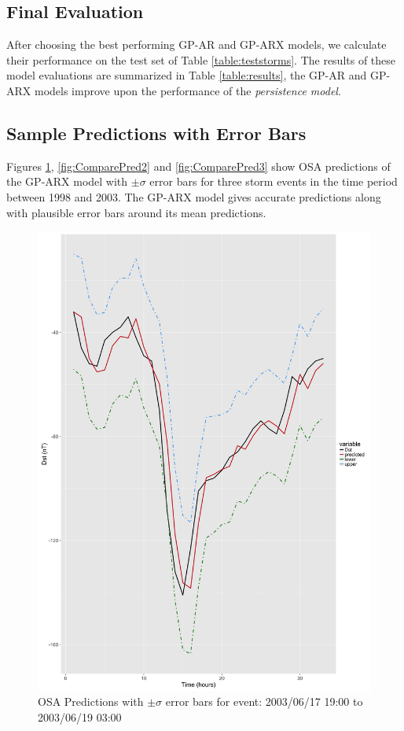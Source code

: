 \documentclass{article}
\begin{document}
\subsection*{Final Evaluation}

After choosing the best performing GP-AR and GP-ARX models, we calculate their performance on the test set of Table \ref{table:teststorms}. The results of these model evaluations are summarized in Table \ref{table:results}, the GP-AR and GP-ARX models improve upon the performance of the \emph{persistence model}.

\subsection*{Sample Predictions with Error Bars}

Figures \ref{fig:ComparePred1}, \ref{fig:ComparePred2} and \ref{fig:ComparePred3} show OSA predictions of the GP-ARX model with $\pm \sigma$ error bars for three storm events in the time period between 1998 and 2003. The GP-ARX model gives accurate predictions along with plausible error bars around its mean predictions.


\begin{figure}[h]
\includegraphics[width=\textwidth]{PredictionsModel1/PredErrBars_Storm43.png}
\caption{OSA Predictions with $\pm \sigma$ error bars for event: 2003/06/17 19:00 to 2003/06/19 03:00}
\label{fig:ComparePred1}
\end{figure}
\end{document}
